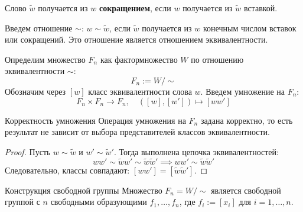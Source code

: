 Слово $\widetilde{w}$ получается из $w$ \textbf{сокращением}, если $w$ получается из $\widetilde{w}$ вставкой.

Введем отношение $\sim$: $w \sim \widetilde{w}$, если $\widetilde{w}$ получается из $w$ конечным числом вставок или сокращений. Это отношение является отношением эквивалентности.

Определим множество $F_n$ как фактормножество $W$ по отношению эквивалентности $\sim$:
\[ F_n := W / \sim \]
Обозначим через $[w]$ класс эквивалентности слова $w$. Введем умножение на $F_n$:
\[ F_n \times F_n \to F_n, \quad ([w], [w']) \mapsto [ww'] \]

\begin{Lemma}{Корректность умножения}{}
	Операция умножения на $F_n$ задана корректно, то есть результат не зависит от выбора представителей классов эквивалентности.
\end{Lemma}

\begin{proof}
	Пусть $w \sim \widetilde{w}$ и $w' \sim \widetilde{w}'$. Тогда выполнена цепочка эквивалентностей:
	\[ ww' \sim \widetilde{w}w' \sim \widetilde{w}\widetilde{w}' \implies ww' \sim \widetilde{w}\widetilde{w}' \]
	Следовательно, классы совпадают: $[ww'] = [\widetilde{w}\widetilde{w}']$.
\end{proof}

\begin{Theorem}{Конструкция свободной группы}{}
	Множество $F_n = W / \sim$ является свободной группой с $n$ свободными образующими $f_1, \dots, f_n$, где $f_i := [x_i]$ для $i = 1, \dots, n$.
\end{Theorem}

